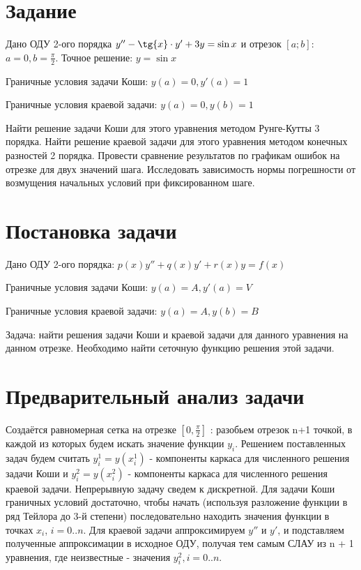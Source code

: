 \documentclass{article}
\begin{document}
	\newpage
	
	\section{Задание}
	
	Дано ОДУ 2-ого порядка $y'' - \tg{x}\cdot y' + 3y = \sin{x}$ и отрезок $[a;b]$: $a = 0, b=\frac{\pi}{2}$.
	Точное решение: $y=\sin{x}$\par
	Граничные условия задачи Коши: $y(a) = 0, y'(a) = 1$ \par
	Граничные условия краевой задачи: $y(a) = 0, y(b) = 1$ \par
	Найти решение задачи Коши для этого уравнения методом Рунге-Кутты 3 порядка. Найти решение краевой задачи для этого уравнения методом конечных разностей 2 порядка. Провести сравнение результатов по графикам ошибок на отрезке для двух значений шага. Исследовать зависимость нормы погрешности от возмущения начальных условий при фиксированном шаге. %
	
	\section{Постановка задачи}
	Дано ОДУ 2-ого порядка: $p(x)y'' + q(x)y' + r(x)y = f(x)$ \par
	Граничные условия задачи Коши: $y(a) = A, y'(a) = V$ \par
	Граничные условия краевой задачи: $y(a) = A, y(b) = B$ \par
	Задача: найти решения задачи Коши и краевой задачи для данного уравнения на данном отрезке. Необходимо найти сеточную функцию решения этой задачи. %

	
	\section{Предварительный анализ задачи}
	Создаётся равномерная сетка на отрезке $[0 , \frac{\pi}{2}]$ : разобьем отрезок n+1 точкой, в каждой из которых будем искать значение функции $y_i$. Решением поставленных задач будем считать $y_i^1 = y(x_i^1)$ - компоненты каркаса для численного решения задачи Коши и $y_i^2 = y(x_i^2)$ - компоненты каркаса для численного решения краевой задачи. Непрерывную задачу сведем к дискретной. Для задачи Коши граничных условий достаточно, чтобы начать (используя разложение функции в ряд Тейлора до 3-й степени) последовательно находить значения функции в точках $x_i$, $i=0..n$. Для краевой задачи аппроксимируем $y''$ и $y'$, и подставляем полученные аппроксимации в исходное ОДУ, получая тем самым СЛАУ из n + 1 уравнения, где неизвестные - значения $y_i^2, i = 0..n$.
	
\end{document}
